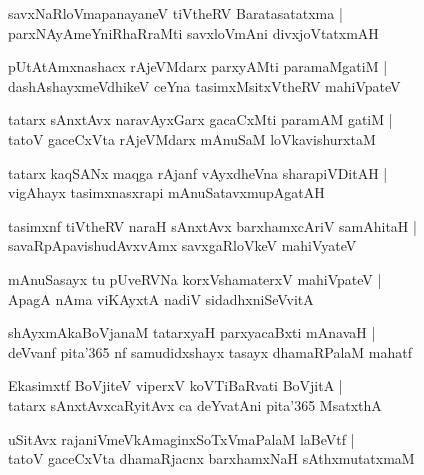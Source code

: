 \documentclass[twoside,12pt,openright]{book}
\newcounter{shloka}[chapter]
\begin{document}
\begin{shloka}
savxNaRloVmapanayaneV tiVtheRV Baratasatatxma |\\
parxNAyAmeYniRhaRraMti savxloVmAni divxjoVtatxmAH 
\end{shloka}

\begin{shloka}
pUtAtAmxnashacx rAjeVMdarx parxyAMti paramaMgatiM |\\
dashAshayxmeVdhikeV ceYna tasimxMsitxVtheRV mahiVpateV
\end{shloka}

\begin{shloka}
tatarx sAnxtAvx naravAyxGarx gacaCxMti paramAM gatiM |\\
tatoV gaceCxVta rAjeVMdarx mAnuSaM loVkavishurxtaM 
\end{shloka}

\begin{shloka}
tatarx kaqSANx maqga rAjanf vAyxdheVna sharapiVDitAH |\\
vigAhayx tasimxnasxrapi mAnuSatavxmupAgatAH
\end{shloka}

\begin{shloka}
tasimxnf tiVtheRV naraH sAnxtAvx barxhamxcAriV samAhitaH |\\
savaRpApavishudAvxvAmx savxgaRloVkeV mahiVyateV 
\end{shloka}

\begin{shloka}
mAnuSasayx tu pUveRVNa korxVshamaterxV mahiVpateV |\\
ApagA nAma viKAyxtA nadiV sidadhxniSeVvitA
\end{shloka}


\begin{shloka}
shAyxmAkaBoVjanaM tatarxyaH parxyacaBxti mAnavaH |\\
deVvanf pita\char'365 nf samudidxshayx tasayx dhamaRPalaM mahatf
\end{shloka}

\begin{shloka}
Ekasimxtf BoVjiteV viperxV koVTiBaRvati BoVjitA |\\
tatarx sAnxtAvxcaRyitAvx ca deYvatAni pita\char'365 MsatxthA
\end{shloka}

\begin{shloka}
uSitAvx rajaniVmeVkAmaginxSoTxVmaPalaM laBeVtf |\\
tatoV gaceCxVta dhamaRjacnx barxhamxNaH sAthxmutatxmaM 
\end{shloka}
\end{document}
